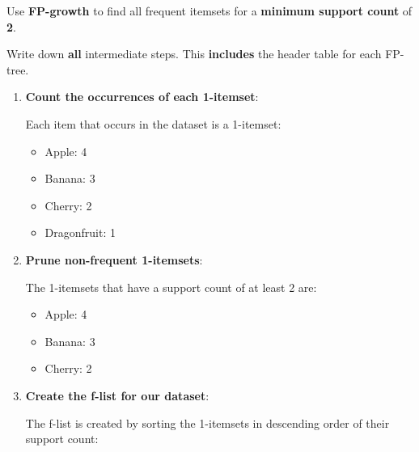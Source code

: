 \documentclass[
english,
smallborders
]{i6prcsht}
\begin{document}
Use \textbf{FP-growth} to find all frequent itemsets for a \textbf{minimum support count} of \textbf{2}.

Write down \textbf{all} intermediate steps. This \textbf{includes} the header table for each FP-tree.

\begin{solution}
	\newcommand{\fptreerootnode}{
		\begin{tikzpicture}
			\node[draw, fill=white, minimum height = 0.65cm, minimum width=2.25cm] at (0,-1) (Label) {$\{\}$};
		\end{tikzpicture}
	}

	\newcommand{\fptreenodewithoccurences}[2]{
		\begin{tikzpicture}
			\node[draw, fill=white, minimum height = 0.65cm, minimum width=1.75cm] at (0,-1) (Label) {$#1$};
			\node[draw, fill=white, minimum height = 0.65cm, minimum width=0.5cm, right = 0cm of Label] {$#2$};
		\end{tikzpicture}
	}

	\begin{enumerate}
		\item \textbf{Count the occurrences of each 1-itemset}:

		      Each item that occurs in the dataset is a 1-itemset:

		      \begin{itemize}
			      \item Apple: 4
			      \item Banana: 3
			      \item Cherry: 2
			      \item Dragonfruit: 1
		      \end{itemize}

		\item \textbf{Prune non-frequent 1-itemsets}:

		      The 1-itemsets that have a support count of at least 2 are:

		      \begin{itemize}
			      \item Apple: 4
			      \item Banana: 3
			      \item Cherry: 2
		      \end{itemize}

		\item \textbf{Create the f-list for our dataset}:

		      The f-list is created by sorting the 1-itemsets in descending order of their support count:


\end{enumerate}
\end{solution}
\end{document}
